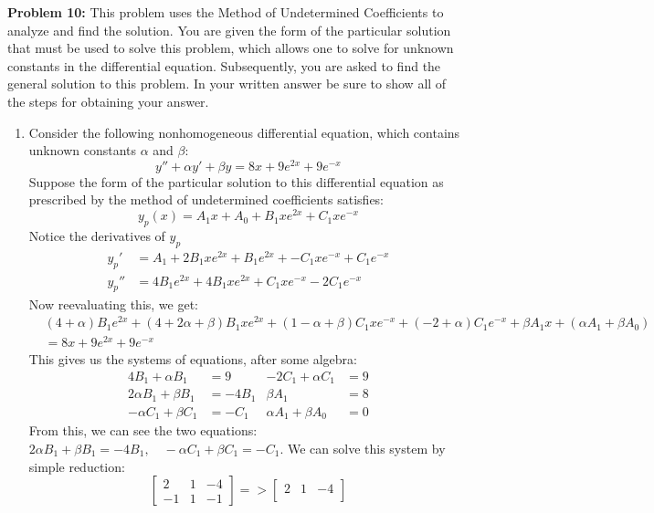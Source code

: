 \documentclass[12pt]{article}
\begin{document}
\newpage

\noindent \textbf{Problem 10: }This problem uses the Method of Undetermined Coefficients to analyze and find the solution. You are given the form of the particular solution that must be used to solve this problem, which allows one to solve for unknown constants in the differential equation. Subsequently, you are asked to find the general solution to this problem. In your written answer be sure to show all of the steps for obtaining your answer.
	\begin{enumerate}[label = (\alph*)]
		\item Consider the following nonhomogeneous differential equation, which contains unknown constants $\alpha$ and $\beta$:
			$$
			y'' + \alpha y' + \beta y = 8 x + 9 e^{2x} + 9 e^{-x}
			$$
		Suppose the form of the particular solution to this differential equation as prescribed by the method of undetermined coefficients satisfies:
			$$
			y_p(x) = A_1x + A_0 + B_1x e^{2x} + C_1x e^{-x}
			$$
		Notice the derivatives of $y_p$
			\begin{align*}
				y_p' &= A_1 + 2B_1xe^{2x} + B_1e^{2x} + -C_1xe^{-x} + C_1e^{-x} \\
				y_p'' &= 4B_1e^{2x} + 4B_1xe^{2x} +  C_1xe^{-x} -2C_1e^{-x} 
			\end{align*}
		Now reevaluating this, we get:
			\begin{align*}
				&(4 + \alpha)B_1e^{2x} + (4 + 2\alpha + \beta)B_1xe^{2x} + (1-\alpha + \beta)C_1xe^{-x} + (-2 + \alpha)C_1 e^{-x} + \beta A_1 x + (\alpha A_1 + \beta A_0) \\
				&= 8 x + 9 e^{2x} + 9 e^{-x}
			\end{align*}
		This gives us the systems of equations, after some algebra:
			\begin{align*}
				4B_1 + \alpha B_1 &= 9  & -2C_1 + \alpha C_1 &= 9 \\
				2\alpha B_1 + \beta B_1 &= -4B_1 & \beta A_1 &= 8 \\
				-\alpha C_1 + \beta C_1 &= -C_1 & \alpha A_1 + \beta A_0 &= 0
			\end{align*}
		From this, we can see the two equations: $2\alpha B_1 + \beta B_1 = -4B_1, \quad -\alpha C_1 + \beta C_1 = -C_1$.  We can solve this system by simple reduction:
			$$
			\begin{bmatrix}
				2 & 1 & -4 \\
				-1 & 1 & -1
			\end{bmatrix}
			=> 
			\begin{bmatrix}
				2 & 1 & -4 \\

\end{bmatrix}$$
\end{enumerate}
\end{document}
